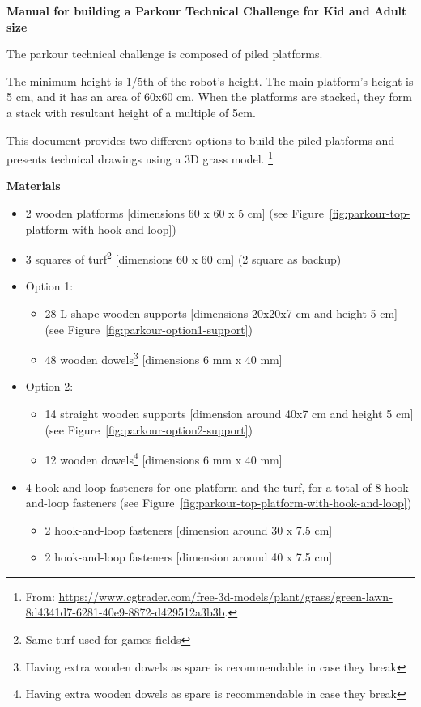 \clearpage
\sffamily
{\bfseries\color[rgb]{0.4,0.4,0.4} Manual for building a Parkour Technical
Challenge for Kid and Adult size}
{}

\bigskip

The parkour technical challenge is composed of piled platforms. 

The minimum height is 1/5th of the robot's height.
The main platform's height is 5 cm, and it has an area of 60x60 cm.
When the platforms are stacked,
they form a stack with resultant height of a multiple of 5cm.

This document provides two different options to build the piled platforms and
presents technical drawings using a 3D grass model.
\footnote{From: \url{https://www.cgtrader.com/free-3d-models/plant/grass/green-lawn-8d4341d7-6281-40e9-8872-d429512a3b3b}.}

\bigskip

{\bfseries Materials}

\headlinebox

\begin{itemize}
\item 2 wooden platforms [dimensions 60 x 60 x 5 cm]
      (see Figure~\ref{fig:parkour-top-platform-with-hook-and-loop})
\item 3 squares of turf\footnote{Same turf used for games fields}
      [dimensions 60 x 60 cm] (2 square as backup)
\item Option 1:
      \begin{itemize}
      \item 28 L-shape wooden supports [dimensions 20x20x7 cm and height 5 cm]
            (see Figure~\ref{fig:parkour-option1-support})
      \item 48 wooden dowels\footnote{Having extra wooden dowels as spare is
              recommendable in case they break} [dimensions 6 mm x 40 mm]
      \end{itemize}
\item Option 2:
      \begin{itemize}
      \item 14 straight wooden supports [dimension around 40x7 cm and height 5
            cm] (see Figure~\ref{fig:parkour-option2-support})
      \item 12 wooden dowels\footnote{Having extra wooden dowels as spare is
              recommendable in case they break} [dimensions 6 mm x 40 mm]
      \end{itemize}
\item 4 hook-and-loop fasteners for one platform and the turf,
      for a total of 8 hook-and-loop fasteners
      (see Figure~\ref{fig:parkour-top-platform-with-hook-and-loop})
      \begin{itemize}
      \item 2 hook-and-loop fasteners [dimension around 30 x 7.5 cm]
      \item 2 hook-and-loop fasteners [dimension around 40 x 7.5 cm]
      \end{itemize}
\end{itemize}

